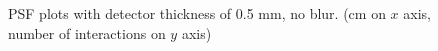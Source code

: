 \documentclass[a4paper]{article}
\begin{document}
\begin{figure}[H]
  \caption{PSF plots with detector thickness of 0.5 mm, no blur. (cm on $x$ axis, number of interactions on $y$ axis)}
  \label{fig:005_xs}
\end{figure}
\end{document}
